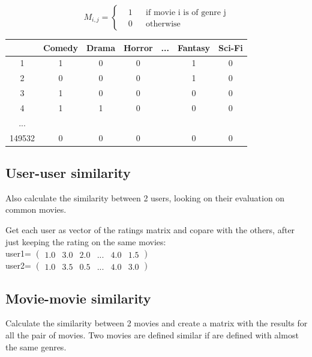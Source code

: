 \documentclass{article}
\begin{document}
\begin{equation}
      \label{eqn:movieMatrix}
      M_{i,j} = \left \{
            \begin{aligned}
                  &1 && \text{if movie i is of genre j}\\
                  &0 && \text{otherwise}
            \end{aligned} \right.
\end{equation}
\begin{center}
      \begin{tabular}{ | c | c | c | c | c | c | c |} 
        \hline
        \rowcolor{lightgray}  & Comedy & Drama & Horror & ... & Fantasy & Sci-Fi \\ 
        \hline
         \cellcolor{lightgray}1 & 1 & 0 & 0 &  & 1 & 0 \\ 
        \hline
        \cellcolor{lightgray}2 & 0 & 0 & 0 &  & 1 & 0 \\ 
        \hline
        \cellcolor{lightgray}3 & 1 & 0 & 0 &  & 0 & 0\\
        \hline
        \cellcolor{lightgray}4 & 1 & 1 & 0 &  & 0 & 0\\
        \hline
        \cellcolor{lightgray}... &  &  &  &  &  & \\ 
        \hline
        \cellcolor{lightgray}149532 & 0 & 0 & 0 &  & 0 & 0\\
        \hline
      \end{tabular}
\end{center}


\subsection{User-user similarity}
Also calculate the similarity between 2 users, looking on their evaluation on common movies. 

Get each user as vector of the ratings matrix and copare with the others, after just keeping the rating on the same movies:\\
user1= $\begin{pmatrix}
      1.0&3.0&2.0&...&4.0&1.5
\end{pmatrix}$\\
user2= $\begin{pmatrix}
      1.0&3.5&0.5&...&4.0&3.0
\end{pmatrix}$
\subsection{Movie-movie similarity}
Calculate the similarity between 2 movies and create a matrix with the results for all the pair of movies. Two movies are defined similar if are defined with almost the same genres.
\end{document}

